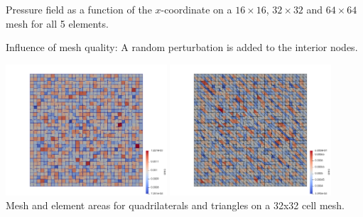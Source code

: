 \begin{center}
{\captionfont Pressure field as a function of the $x$-coordinate on a $16\times16$,
$32\times 32$ and $64\times 64$ mesh for all 5 elements.} 
\end{center}

\newpage

Influence of mesh quality:
A random perturbation is added to the interior nodes. 

\begin{center}
\includegraphics[width=6cm]{python_codes/fieldstone_112/results/exp1_rand/area_quads}
\includegraphics[width=6cm]{python_codes/fieldstone_112/results/exp1_rand/area_tris}\\
{\captionfont Mesh and element areas for quadrilaterals and triangles on a 32x32 cell mesh.}
\end{center}


